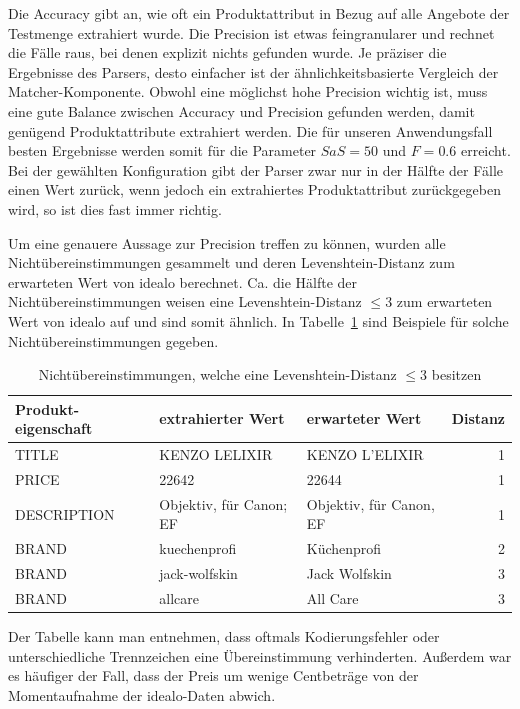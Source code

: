 Die Accuracy gibt an, wie oft ein Produktattribut in Bezug auf alle Angebote der Testmenge extrahiert wurde.
Die Precision ist etwas feingranularer und rechnet die Fälle raus, bei denen explizit nichts gefunden wurde.
Je präziser die Ergebnisse des Parsers, desto einfacher ist der ähnlichkeitsbasierte Vergleich der Matcher-Komponente.
Obwohl eine möglichst hohe Precision wichtig ist, muss eine gute Balance zwischen Accuracy und Precision gefunden
werden, damit genügend Produktattribute extrahiert werden.
Die für unseren Anwendungsfall besten Ergebnisse werden somit für die Parameter $SaS = 50$ und $F= 0.6$ erreicht.
Bei der gewählten Konfiguration gibt der Parser zwar nur in der Hälfte der Fälle einen Wert zurück, wenn jedoch ein
extrahiertes Produktattribut zurückgegeben wird, so ist dies fast immer richtig.

Um eine genauere Aussage zur Precision treffen zu können, wurden alle Nichtübereinstimmungen gesammelt und deren
Levenshtein-Distanz zum erwarteten Wert von idealo berechnet.
Ca. die Hälfte der Nichtübereinstimmungen weisen eine Levenshtein-Distanz $\leq 3$ zum erwarteten Wert von idealo
auf und sind somit ähnlich.
In Tabelle~\ref{tab:levenshtein-examples} sind Beispiele für solche Nichtübereinstimmungen gegeben.

\begin{table}[h]
    \centering
    \begin{tabular}{ p{2.75cm} | p{4.5cm} | p{4.5cm} | r}
        \textbf{Produkt-eigenschaft} & \textbf{extrahierter Wert} & \textbf{erwarteter Wert} &
        \textbf{Distanz} \\
        \hline
        TITLE & KENZO LELIXIR & KENZO L'ELIXIR & 1\\
        PRICE & 22642 & 22644 & 1\\
        DESCRIPTION & Objektiv, für Canon; EF	& Objektiv, für Canon, EF & 1\\
        BRAND &	kuechenprofi & Küchenprofi & 2\\
        BRAND & jack-wolfskin & Jack Wolfskin & 3\\
        BRAND & allcare & All Care & 3
    \end{tabular}
    \caption{Nichtübereinstimmungen, welche eine Levenshtein-Distanz $\leq 3$ besitzen}
    \label{tab:levenshtein-examples}
    \vspace{-0.25cm}
\end{table}

Der Tabelle kann man entnehmen, dass oftmals Kodierungsfehler oder unterschiedliche Trennzeichen eine
Übereinstimmung verhinderten.
Außerdem war es häufiger der Fall, dass der Preis um wenige Centbeträge von der Momentaufnahme der idealo-Daten
abwich.

